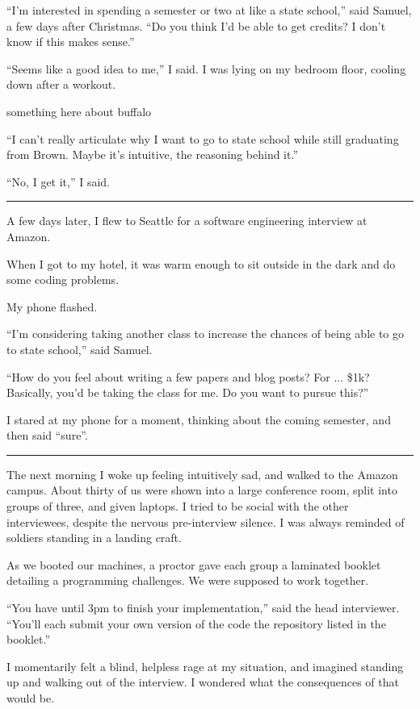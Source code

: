 ``I'm interested in spending a semester or two at like a state school,'' said
Samuel, a few days after Christmas.  ``Do you think I'd be able to get credits?
I don't know if this makes sense.''

``Seems like a good idea to me,'' I said.  I was lying on my bedroom floor,
cooling down after a workout.  

something here about buffalo

``I can't really articulate why I want to go to state school while still
graduating from Brown.   Maybe it's intuitive, the reasoning behind it.'' 

``No, I get it,'' I said. 

\plainfancybreak{12pt}{2}{* * *}

A few days later, I flew to Seattle for a software engineering interview at
Amazon.

When I got to my hotel, it was warm enough to sit outside in the dark and do
some coding problems.

My phone flashed.

``I'm considering taking another class to increase the chances of being able to
go to state school,'' said Samuel.  

``How do you feel about writing a few papers and blog posts?  For ... \$1k?
Basically, you'd be taking the class for me.  Do you want to pursue this?'' 

I stared at my phone for a moment, thinking about the coming semester, and then
said ``sure''.

\plainfancybreak{12pt}{2}{* * *}

The next morning I woke up feeling intuitively sad, and walked to the Amazon
campus.  About thirty of us were shown into a large conference room, split into
groups of three, and given laptops.  I tried to be social with the other
interviewees, despite the nervous pre-interview silence.  I was always reminded
of soldiers standing in a landing craft.

As we booted our machines, a proctor gave each group a laminated booklet
detailing a programming challenges.  We were supposed to work together.

``You have until 3pm to finish your implementation,'' said the head interviewer.
``You'll each submit your own version of the code the repository listed in the
booklet.''

I momentarily felt a blind, helpless rage at my situation, and imagined standing
up and walking out of the interview.  I wondered what the consequences of that
would be.  

